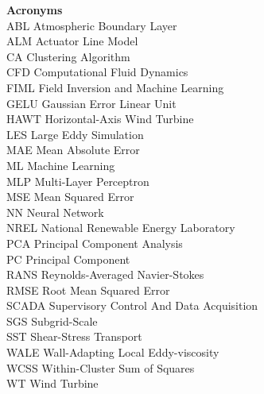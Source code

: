 \textbf{Acronyms} \\
ABL                  Atmospheric Boundary Layer \\
ALM                  Actuator Line Model \\
CA                   Clustering Algorithm \\
CFD                  Computational Fluid Dynamics \\
FIML                 Field Inversion and Machine Learning \\
GELU                 Gaussian Error Linear Unit \\
HAWT                 Horizontal-Axis Wind Turbine \\
LES                  Large Eddy Simulation \\
MAE                  Mean Absolute Error \\
ML                   Machine Learning \\
MLP                  Multi-Layer Perceptron \\
MSE                  Mean Squared Error \\
NN                   Neural Network \\
NREL                 National Renewable Energy Laboratory \\
PCA                  Principal Component Analysis \\
PC                   Principal Component \\
RANS                 Reynolds-Averaged Navier-Stokes \\
RMSE                 Root Mean Squared Error \\
SCADA                Supervisory Control And Data Acquisition \\
SGS                  Subgrid-Scale \\
SST                  Shear-Stress Transport \\
WALE                 Wall-Adapting Local Eddy-viscosity \\
WCSS                 Within-Cluster Sum of Squares \\
WT                   Wind Turbine \\
